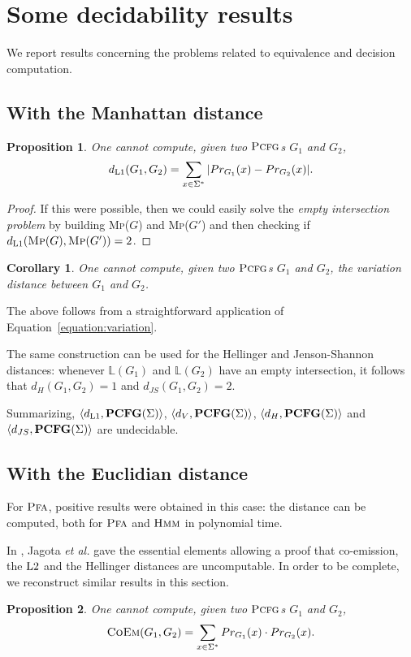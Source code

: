 \documentclass[submission]{eptcs} \usepackage{breakurl}             \usepackage[english]{babel}
\newtheorem{proposition}{Proposition}
\newtheorem{corollary}{Corollary}
\providecommand{\PCFGclass}{\textup{\textbf{PCFG}(\ensuremath{\Sigma})}}
\providecommand{\Lone}{\textup{L1}}
\providecommand{\Ltwo}{\textup{L2}}
\providecommand{\PCFG}{\ensuremath{\textsc{Pcfg}}}
\providecommand{\PFA}{\ensuremath{\textsc{Pfa}}}
\providecommand{\HMM}{\ensuremath{\textsc{Hmm}}}
\providecommand{\Naming}{\ensuremath{\mathbb L}}
\providecommand{\Prob}{\ensuremath{Pr}}
\providecommand{\COEM}{\ensuremath{\textsc{CoEm}}}
\begin{document}
\section{Some decidability results}\label{sec:res}
We report results concerning the problems related to equivalence and decision computation. 
\subsection{With the Manhattan distance}
\begin{proposition}
One cannot compute, given two $\PCFG$s $G_1$ and $G_2$,
$$
d_{\Lone}(G_1,G_2)=\sum_{x\in\Sigma^*}|\Prob_{G_1}(x)-\Prob_{G_2}(x)|.
$$
\end{proposition}
\begin{proof}
If this were possible, then we could easily solve the \emph{empty intersection problem} by building  \textsc{Mp}($G$) and \textsc{Mp}($G'$) and then checking if $d_{\Lone}(\mbox{\textsc{Mp}}(G),\mbox{\textsc{Mp}}(G'))=2$.
\end{proof}
\begin{corollary}
One cannot compute, given two $\PCFG$s $G_1$ and $G_2$, the variation distance between $G_1$ and $G_2$.
\end{corollary}
The above follows from a straightforward application of Equation~\ref{equation:variation}.

The same construction can be used for the Hellinger and Jenson-Shannon distances: whenever $\Naming(G_1)$ and $\Naming(G_2)$ have an empty intersection, it follows that $d_{H}(G_1,G_2)=1$ and $d_{JS}(G_1,G_2)=2$.

Summarizing, $\langle d_{\Lone},\PCFGclass\rangle$, $\langle d_{V},\PCFGclass\rangle$, $\langle d_{H},\PCFGclass\rangle$ and $\langle d_{JS},\PCFGclass\rangle$  are undecidable.

\subsection{With the Euclidian distance}
For $\PFA$, positive results were obtained in this case: the distance can be computed, both for $\PFA$ and $\HMM$ in polynomial time\cite{lyng99}.

In \cite{jago01}, Jagota \textit{et al.} gave the essential elements allowing a proof that co-emission, the $\Ltwo$ and the Hellinger distances are uncomputable. In order to be complete, we reconstruct similar results in this section.

\begin{proposition}
One cannot compute, given two {\PCFG}s $G_1$ and $G_2$,
$$
\COEM(G_1,G_2)=\sum_{x\in\Sigma^*}\Prob_{G_1}(x)\cdot\Prob_{G_2}(x).
$$
\end{proposition}
\end{document}
